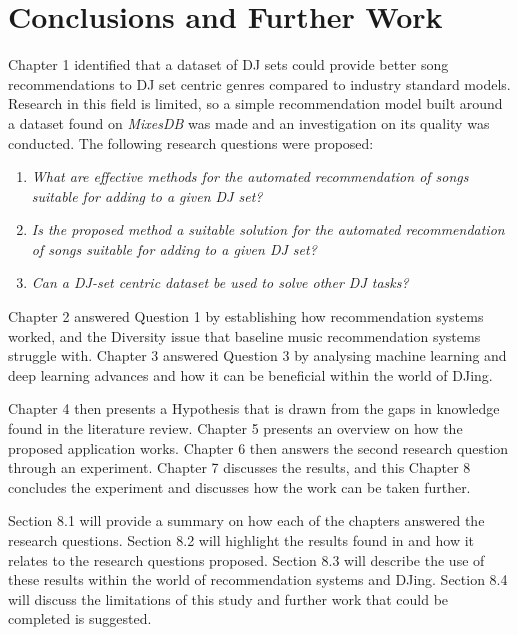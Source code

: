 
\graphicspath{{Chapter7/}}

\chapter{Conclusions and Further Work} 

Chapter 1 identified that a dataset of  DJ sets could provide better song recommendations to DJ set centric genres compared to industry standard models. Research in this field is limited, so a simple recommendation model built around a dataset found on \textit{MixesDB} was made and an investigation on its quality was conducted. The following research questions were proposed:

\begin{enumerate}
	\item \textit{What are effective methods for the automated recommendation of songs suitable
		for adding to a given DJ set?}
	\item \textit{Is the proposed method a suitable solution for the automated recommendation of songs suitable for adding to a given DJ set?}
	\item \textit{Can a DJ-set centric dataset be used to solve other DJ tasks?}
\end{enumerate}

Chapter 2 answered Question 1 by establishing how recommendation systems worked, and the Diversity issue that baseline music recommendation systems struggle with. Chapter 3 answered Question 3 by analysing machine learning and deep learning advances and how it can be beneficial within the world of DJing. 

Chapter 4 then presents a Hypothesis that is drawn from the gaps in knowledge found in the literature review. Chapter 5 presents an overview on how the proposed application works. Chapter 6 then answers the second research question through an experiment. Chapter 7 discusses the results, and this Chapter 8 concludes the experiment and discusses how the work can be taken further.

Section 8.1 will provide a summary on how each of the chapters answered the research questions.
Section 8.2 will highlight the results found in and how it relates to the research questions proposed. Section 8.3 will describe the use of these results within the world of  recommendation systems and DJing. Section 8.4 will discuss the limitations of
this  study and  further work that could be completed is suggested.

